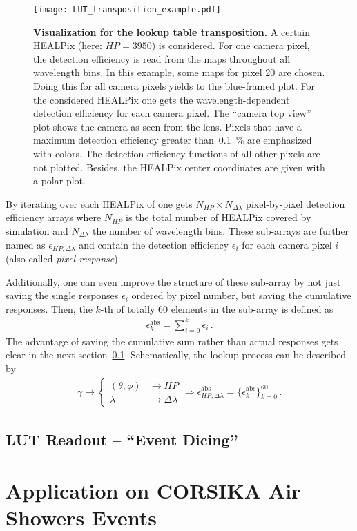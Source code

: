 \begin{figure}[H]
	\texttt{[image: LUT\_transposition\_example.pdf]}
	\caption[Visualization for the lookup table transposition]{\textbf{Visualization for the lookup table transposition.} A certain HEALPix (here: $HP=\num{3950}$) is considered. For one camera pixel, the detection efficiency is read from the maps throughout all wavelength bins. In this example, some maps for pixel \num{20} are chosen. Doing this for all camera pixels yields to the blue-framed plot. For the considered HEALPix one gets the wavelength-dependent detection efficiency for each camera pixel. The \enquote{camera top view} plot shows the camera as seen from the lens. Pixels that have a maximum detection efficiency greater than~\SI{0.1}{\percent} are emphasized with colors. The detection efficiency functions of all other pixels are not plotted. Besides, the HEALPix center coordinates are given with a polar plot.}
	\label{lut:transpose_example}
\end{figure}

By iterating over each HEALPix of one gets $N_{HP}\times N_{\Delta\lambda}$ pixel-by-pixel detection efficiency arrays where $N_{HP}$ is the total number of HEALPix covered by simulation and $N_{\Delta\lambda}$ the number of wavelength bins. These sub-arrays are further named as $\epsilon_{HP,\Delta\lambda}$ and contain the detection efficiency $\epsilon_i$ for each camera pixel $i$ (also called \textit{pixel response}). 

Additionally, one can even improve the structure of these sub-array by not just saving the single responses $\epsilon_i$ ordered by pixel number, but saving the cumulative responses. Then, the $k$-th of totally \num{60} elements in the sub-array is defined as 
\begin{align}
	\epsilon^\text{abs}_k = \sum_{i=0}^{k} \epsilon_i\,.
\end{align}
The advantage of saving the cumulative sum rather than actual responses gets clear in the next section~\ref{sec:lut_readout}. Schematically, the lookup process can be described by
\begin{align}
	\gamma \rightarrow
	\begin{cases}
		(\theta,\phi) & \rightarrow HP\\
		\lambda & \rightarrow \Delta\lambda
	\end{cases}
	\Rightarrow \epsilon^\text{abs}_{HP,\Delta\lambda} = \{\epsilon^\text{abs}_k\}_{k=0}^{60}\,.
\end{align}

\subsection{LUT Readout -- \enquote{Event Dicing}}\label{sec:lut_readout}

\section{Application on CORSIKA Air Showers Events}
